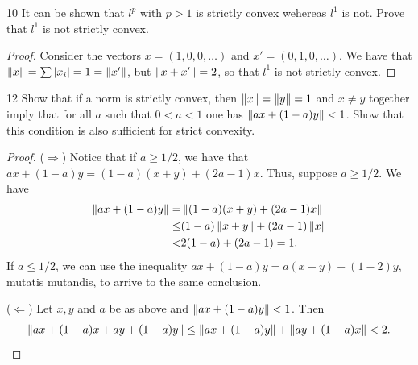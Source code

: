 \begin{exercise}{10}
It can be shown that $l^p$ with $p > 1$ is strictly convex wehereas $l^1$ is not.
Prove that $l^1$ is not strictly convex.
\end{exercise}
\begin{proof}
Consider the vectors $x = (1, 0, 0, \dots)$ and $x' = (0, 1, 0, \dots)$.
We have that $\left\lVert x\right\rVert = \sum \left\lvert x_i\right\rvert = 1 = \left\lVert x'\right\rVert$, but $\left\lVert x + x'\right\rVert = 2$, so that $l^1$ is not strictly convex.
\end{proof} 

\begin{exercise}{12}
Show that if a norm is strictly convex, then $\left\lVert x\right\rVert = \left\lVert y\right\rVert = 1$ and $x \neq y$ together imply that for all $a$ such that $0 < a < 1$ one has $\left\lVert ax + (1-a)y\right\rVert < 1$.
Show that this condition is also sufficient for strict convexity.
\end{exercise}
\begin{proof}
($\Rightarrow$)
Notice that if $a \geq 1/2$, we have that $ax + (1-a)y = (1-a)(x+y) + (2a-1)x$.
Thus, suppose $a \geq 1/2$.
We have
\begin{align*}
    \left\lVert ax + (1-a)y\right\rVert
    =& \left\lVert (1-a)(x+y) + (2a-1)x\right\rVert\\
    \leq& (1-a)\left\lVert x+y\right\rVert + (2a-1)\left\lVert x\right\rVert\\
    <& 2(1-a) + (2a-1) = 1.
\end{align*}
If $a \leq 1/2$, we can use the inequality $ax + (1-a)y = a(x+y) + (1-2)y$, mutatis mutandis, to arrive to the same conclusion.

($\Leftarrow$)
Let $x, y$ and $a$ be as above and $\left\lVert ax + (1-a)y\right\rVert < 1$.
Then
\begin{align*}
    \left\lVert ax + (1-a)x + ay + (1-a)y\right\rVert
    \leq \left\lVert ax + (1-a)y\right\rVert + \left\lVert ay + (1-a)x\right\rVert
    < 2.
\end{align*}
\end{proof} 
